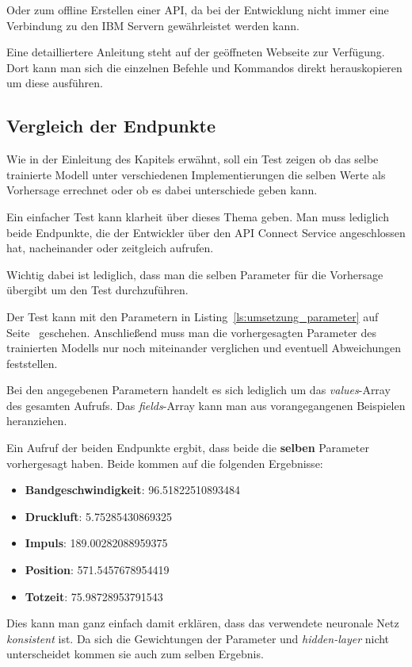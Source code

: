 Oder zum offline Erstellen einer API, da bei der Entwicklung nicht immer eine Verbindung zu den IBM Servern
gewährleistet werden kann.

Eine detailliertere Anleitung steht auf der geöffneten Webseite zur Verfügung. Dort kann man sich die einzelnen Befehle
und Kommandos direkt herauskopieren um diese ausführen.

\subsection{Vergleich der Endpunkte}
Wie in der Einleitung des Kapitels erwähnt, soll ein Test zeigen ob das selbe trainierte Modell unter verschiedenen
Implementierungen die selben Werte als Vorhersage errechnet oder ob es dabei unterschiede geben kann.

Ein einfacher Test kann klarheit über dieses Thema geben. Man muss lediglich beide Endpunkte, die der Entwickler über 
den API Connect Service angeschlossen hat, nacheinander oder zeitgleich aufrufen.

Wichtig dabei ist lediglich, dass man die selben Parameter für die Vorhersage übergibt um den Test durchzuführen.

Der Test kann mit den Parametern in Listing~\ref{ls:umsetzung_parameter} auf Seite~\pageref{ls:umsetzung_parameter} 
geschehen. Anschließend muss man die vorhergesagten Parameter des trainierten Modells nur noch miteinander verglichen
und eventuell Abweichungen feststellen.

Bei den angegebenen Parametern handelt es sich lediglich um das \textit{values}-Array des gesamten Aufrufs. Das 
\textit{fields}-Array kann man aus vorangegangenen Beispielen heranziehen.

Ein Aufruf der beiden Endpunkte ergbit, dass beide die \textbf{selben} Parameter vorhergesagt haben. Beide kommen auf 
die folgenden Ergebnisse:

\begin{itemize}
    \item \textbf{Bandgeschwindigkeit}: 96.51822510893484
    \item \textbf{Druckluft}: 5.75285430869325
    \item \textbf{Impuls}: 189.00282088959375
    \item \textbf{Position}: 571.5457678954419
    \item \textbf{Totzeit}: 75.98728953791543
\end{itemize}

Dies kann man ganz einfach damit erklären, dass das verwendete neuronale Netz \textit{konsistent} ist. Da sich die 
Gewichtungen der Parameter und \textit{hidden-layer} nicht unterscheidet kommen sie auch zum selben Ergebnis. 

